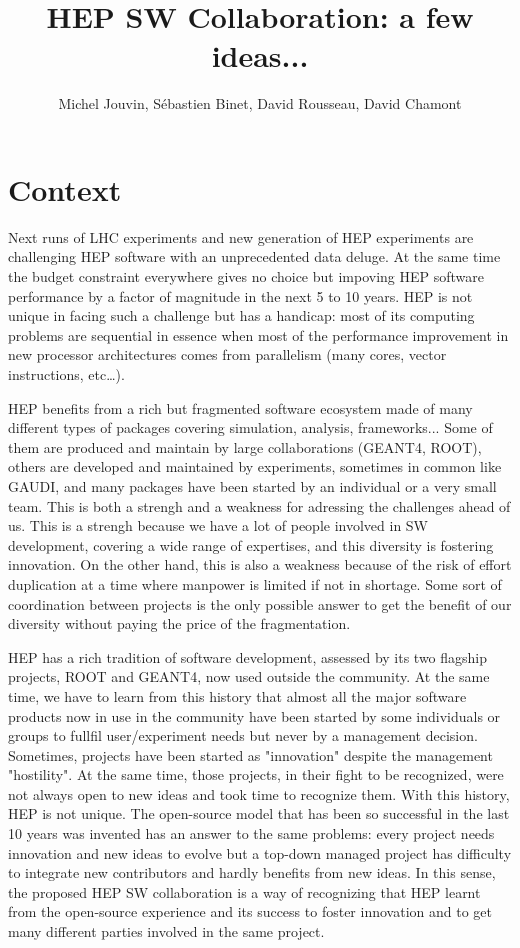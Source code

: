 \documentclass[11pt]{article} %
\title{HEP SW Collaboration: a few ideas...}
\author{Michel Jouvin, S\'ebastien Binet, David Rousseau, David Chamont}
\begin{document}
\maketitle

\section{Context}

Next runs of LHC experiments and new generation of HEP experiments are
challenging HEP software with an unprecedented data deluge. At the
same time the budget constraint everywhere gives no choice but
impoving HEP software performance by a factor of magnitude in the next
5 to 10 years. HEP is not unique in facing such a challenge but has a
handicap: most of its computing problems are sequential in essence
when most of the performance improvement in new processor
architectures comes from parallelism (many cores, vector
instructions, etc\ldots).

HEP benefits from a rich but fragmented software ecosystem made of
many different types of packages covering simulation, analysis,
frameworks... Some of them are produced and maintain by large
collaborations (GEANT4, ROOT), others are developed and maintained by
experiments, sometimes in common like GAUDI, and many packages have
been started by an individual or a very small team. This is both a
strengh and a weakness for adressing the challenges ahead of us. This
is a strengh because we have a lot of people involved in SW
development, covering a wide range of expertises, and this diversity is
fostering innovation. On the other hand, this is also a weakness
because of the risk of effort duplication at a time where manpower is
limited if not in shortage. Some sort of coordination between projects
is the only possible answer to get the benefit of our diversity
without paying the price of the fragmentation.

HEP has a rich tradition of software development, assessed by its two
flagship projects, ROOT and GEANT4, now used outside the community. At
the same time, we have to learn from this history that almost all the
major software products now in use in the community have been started
by some individuals or groups to fullfil user/experiment needs but
never by a management decision. Sometimes, projects have been started
as "innovation" despite the management "hostility". At the same time,
those projects, in their fight to be recognized, were not always open
to new ideas and took time to recognize them. With this history, HEP
is not unique. The open-source model that has been so successful in
the last 10 years was invented has an answer to the same problems:
every project needs innovation and new ideas to evolve but a top-down
managed project has difficulty to integrate new contributors and
hardly benefits from new ideas. In this sense, the proposed HEP SW
collaboration is a way of recognizing that HEP learnt from the
open-source experience and its success to foster innovation and to get
many different parties involved in the same project.
\end{document}

